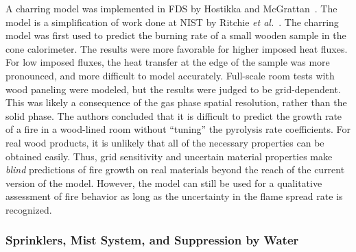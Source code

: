 A   charring  model   was   implemented  in   FDS   by  Hostikka   and McGrattan~\cite{Hostikka:2}.  The model  is a  simplification  of work done at
NIST by Ritchie  {\em et al.}~\cite{Ritchie:1}.  The charring model was  first used to  predict the burning  rate of a  small wooden sample in the
cone calorimeter.  The results were  more favorable for higher imposed heat fluxes. For  low imposed fluxes, the heat transfer at the edge  of the
sample was more pronounced,  and more difficult to model  accurately.   Full-scale room  tests  with  wood paneling  were modeled, but  the results
were  judged to be grid-dependent.  This was likely a consequence of the  gas phase spatial resolution, rather than the solid phase. The authors
concluded that it is difficult to predict the growth rate of a fire  in a wood-lined room without ``tuning'' the pyrolysis rate  coefficients. For
real  wood products, it  is unlikely that all  of the  necessary properties can  be obtained  easily. Thus, grid sensitivity  and uncertain  material
properties make  {\em blind} predictions of fire  growth on real materials beyond  the reach of the current version of the model. However, the model
can still be used for a qualitative assessment  of fire behavior as long  as the uncertainty in the flame spread rate is recognized.


\subsubsection{Sprinklers, Mist System, and Suppression by Water}

